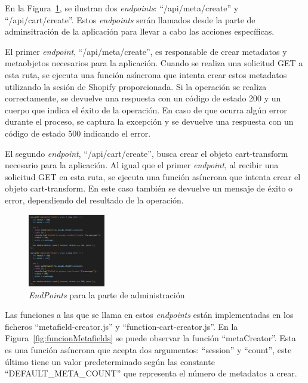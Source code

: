 \documentclass[11pt]{article}
\begin{document}
En la Figura~\ref{fig:endpointsAdmin}, se ilustran dos \textit{endpoints}: ``/api/meta/create'' y ``/api/cart/create''. Estos \textit{endpoints} serán
llamados desde la parte de adminsitración de la aplicación para llevar a cabo las acciones específicas.

El primer \textit{endpoint}, ``/api/meta/create'', es responsable de crear metadatos y metaobjetos necesarios para la aplicación. Cuando se realiza
una solicitud GET a esta ruta, se ejecuta una función asíncrona que intenta crear estos metadatos utilizando la sesión de Shopify proporcionada.
Si la operación se realiza correctamente, se devuelve una respuesta con un código de estado 200 y un cuerpo que indica el éxito de la operación. 
En caso de que ocurra algún error durante el proceso, se captura la excepción y se devuelve una respuesta con un código 
de estado 500 indicando el error.

El segundo \textit{endpoint}, ``/api/cart/create'', busca crear el objeto cart-transform necesario para la aplicación. Al igual que el primer \textit{endpoint}, al recibir
una solicitud GET en esta ruta, se ejecuta una función asíncrona que intenta crear el objeto cart-transform. En este caso también se devuelve un 
mensaje de éxito o error, dependiendo del resultado de la operación.

\begin{figure}[H]
    \centering
    \includegraphics[width=0.3\textwidth]{imagenes-back/EndpointsAdmin.png}
    \caption{\label{fig:endpointsAdmin} \textit{EndPoints} para la parte de administración }
    \vspace{\fill}
\end{figure}

Las funciones a las que se llama en estos \textit{endpoints} están implementadas en los ficheros ``metafield-creator.js'' y ``function-cart-creator.js''.
En la Figura~\ref{fig:funcionMetafields} se puede observar la función ``metaCreator''. Esta es una función asíncrona que acepta dos argumentos:
``session'' y ``count'', este último tiene un valor predeterminado según las constante ``DEFAULT\_META\_COUNT'' que representa el número de metadatos a crear.
\end{document}
